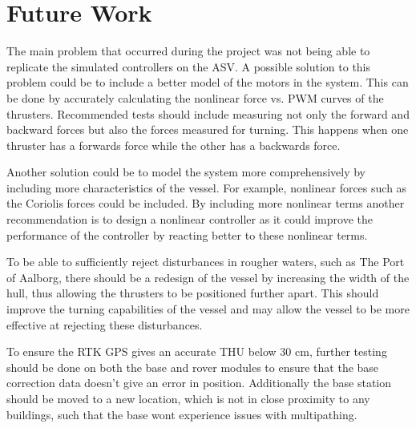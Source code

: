 \chapter{Future Work}

The main problem that occurred during the project was not being able to replicate the simulated controllers on the ASV. A possible solution to this problem could be to include a better model of the motors in the system. This can be done by accurately calculating the nonlinear force vs. PWM curves of the thrusters. Recommended tests should include measuring not only the forward and backward forces but also the forces measured for turning. This happens when one thruster has a forwards force while the other has a backwards force.

Another solution could be to model the system more comprehensively by including more characteristics of the vessel. For example, nonlinear forces such as the Coriolis forces could be included. By including more nonlinear terms another recommendation is to design a nonlinear controller as it could improve the performance of the controller by reacting better to these nonlinear terms.

To be able to sufficiently reject disturbances in rougher waters, such as The Port of Aalborg, there should be a redesign of the vessel by increasing the width of the hull, thus allowing the thrusters to be positioned further apart. This should improve the turning capabilities of the vessel and may allow the vessel to be more effective at rejecting these disturbances.

To ensure the RTK GPS gives an accurate THU below 30 cm, further testing should be done on both the base and rover modules to ensure that the base correction data doesn't give an error in position.
Additionally the base station should be moved to a new location, which is not in close proximity to any buildings, such that the base wont experience issues with multipathing.


% 

